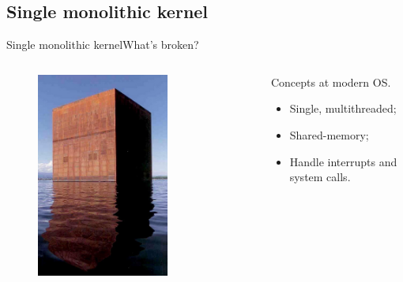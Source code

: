 \documentclass[10pt]{beamer}
\begin{document}
\subsection{Single monolithic kernel}
\begin{frame}{Single monolithic kernel}{What's broken?}
  \begin{columns}[T]
    \begin{column}{.3\textwidth}
      \begin{figure}[ht]
        \centering
        \includegraphics[width=0.7\textwidth, keepaspectratio=true]{images/monolith.png}
      \end{figure}
    \end{column} \pause

    \hfill
    \begin{column}{.7\textwidth}
      \begin{block}{}
        Concepts at modern OS.
      \end{block} \pause

      \begin{itemize}
        \item Single, multithreaded; \pause
        \item Shared-memory; \pause
        \item Handle interrupts and system calls.
      \end{itemize}
    \end{column}
  \end{columns}
\end{frame}
\end{document}
